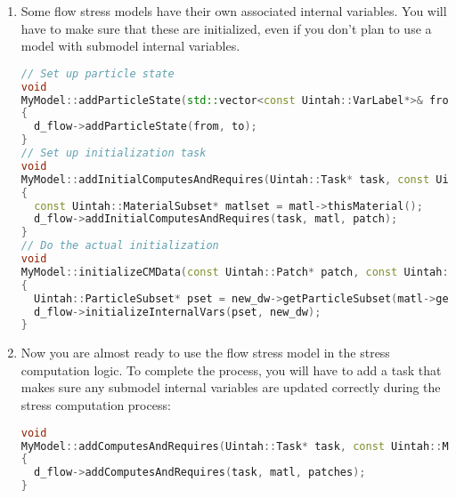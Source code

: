 \begin{enumerate}
  \item Some flow stress models have their own associated internal variables.  You will
        have to make sure that these are initialized, even if you don't plan to use a 
        model with submodel internal variables.
\begin{lstlisting}[language=Cpp]
// Set up particle state
void
MyModel::addParticleState(std::vector<const Uintah::VarLabel*>& from, std::vector<const Uintah::VarLabel*>& to)
{
  d_flow->addParticleState(from, to);
}
// Set up initialization task
void
MyModel::addInitialComputesAndRequires(Uintah::Task* task, const Uintah::MPMMaterial* matl, const Uintah::PatchSet* patch) const
{
  const Uintah::MaterialSubset* matlset = matl->thisMaterial();
  d_flow->addInitialComputesAndRequires(task, matl, patch);
}
// Do the actual initialization
void
MyModel::initializeCMData(const Uintah::Patch* patch, const Uintah::MPMMaterial* matl, Uintah::DataWarehouse* new_dw)
{
  Uintah::ParticleSubset* pset = new_dw->getParticleSubset(matl->getDWIndex(), patch);
  d_flow->initializeInternalVars(pset, new_dw);
}
\end{lstlisting}

  \item Now you are almost ready to use the flow stress model in the stress computation 
        logic.  To complete the process, you will have to add a task that makes sure 
        any submodel internal variables are updated correctly during the stress computation
        process:
\begin{lstlisting}[language=Cpp]
void
MyModel::addComputesAndRequires(Uintah::Task* task, const Uintah::MPMMaterial* matl, const Uintah::PatchSet* patches) const
{
  d_flow->addComputesAndRequires(task, matl, patches);
}
\end{lstlisting}


\end{enumerate}
